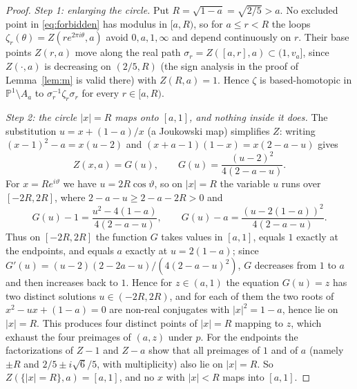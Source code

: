 \documentclass[11pt]{article}
\newcommand{\Pone}{\mathbb P^1}
\theoremstyle{remark}
\numberwithin{equation}{section}
\begin{document}
\begin{proof}
\emph{Step 1: enlarging the circle.} Put $R=\sqrt{1-a}=\sqrt{2/5}>a$. No
excluded point in \eqref{eq:forbidden} has modulus in $[a,R)$, so for
$a\le r<R$ the loops $\zeta_r(\theta)=Z(re^{2\pi i\theta},a)$ avoid $0,a,1,\infty$
and depend continuously on $r$. Their base points $Z(r,a)$ move along the
real path $\sigma_r=Z([a,r],a)\subset(1,v_a]$, since $Z(\cdot,a)$ is
decreasing on $(2/5,R)$ (the sign analysis in the proof of
Lemma~\ref{lem:m} is valid there) with $Z(R,a)=1$. Hence $\zeta$ is
based-homotopic in $\Pone\setminus A_a$ to $\sigma_r^{-1}\zeta_r\sigma_r$
for every $r\in[a,R)$.

\emph{Step 2: the circle $|x|=R$ maps onto $[a,1]$, and nothing inside it
does.} The substitution $u=x+(1-a)/x$ (a Joukowski map) simplifies $Z$:
writing $(x-1)^2-a=x(u-2)$ and $(x+a-1)(1-x)=x(2-a-u)$ gives
\begin{equation}\label{eq:Joukowski}
 Z(x,a)=G(u),\qquad G(u)=\frac{(u-2)^2}{4(2-a-u)}.
\end{equation}
For $x=Re^{i\vartheta}$ we have $u=2R\cos\vartheta$, so on $|x|=R$ the
variable $u$ runs over $[-2R,2R]$, where
$2-a-u\ge 2-a-2R>0$ and
\[
 G(u)-1=\frac{u^2-4(1-a)}{4(2-a-u)},\qquad
 G(u)-a=\frac{(u-2(1-a))^2}{4(2-a-u)} .
\]
Thus on $[-2R,2R]$ the function $G$ takes values in $[a,1]$, equals $1$
exactly at the endpoints, and equals $a$ exactly at $u=2(1-a)$; since
$G'(u)=(u-2)(2-2a-u)/(4(2-a-u)^2)$, $G$ decreases from $1$ to $a$ and then
increases back to $1$. Hence for $z\in(a,1)$ the equation $G(u)=z$ has two
distinct solutions $u\in(-2R,2R)$, and for each of them the two roots of
$x^2-ux+(1-a)=0$ are non-real conjugates with $|x|^2=1-a$, hence lie on
$|x|=R$. This produces four distinct points of $|x|=R$ mapping to $z$,
which exhaust the four preimages of $(a,z)$ under $p$. For the endpoints
the factorizations of $Z-1$ and $Z-a$ show that all preimages of $1$ and
of $a$ (namely $\pm R$ and $2/5\pm i\sqrt6/5$, with multiplicity) also lie
on $|x|=R$. So $Z(\{|x|=R\},a)=[a,1]$, and no $x$ with $|x|<R$ maps into
$[a,1]$.


\end{proof}
\end{document}
